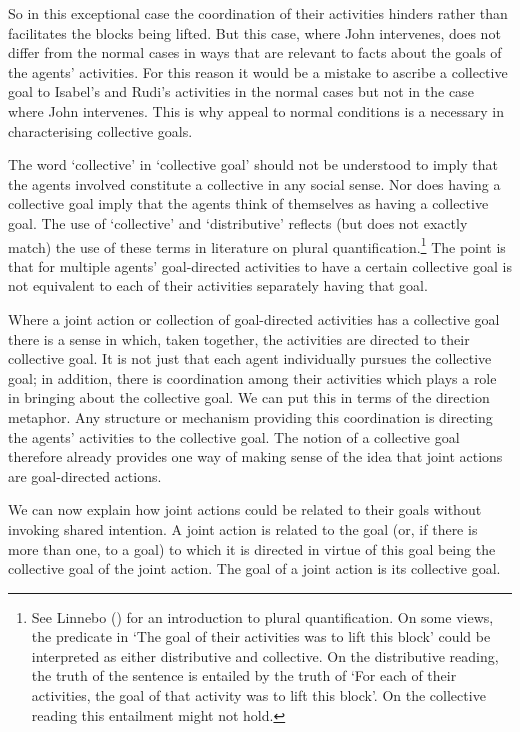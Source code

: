 \documentclass[12pt,a4paper]{extarticle}
\begin{document}
So in this exceptional case the coordination of their activities hinders rather than facilitates the blocks being lifted.
But this case, where John intervenes, does not differ from the normal cases in ways that are relevant to facts about the goals of the agents' activities.  
For this reason it would be a mistake to ascribe a collective goal to Isabel's and Rudi's activities in the normal cases but not in the case where John intervenes. 
This is why appeal to normal conditions is a necessary in characterising collective goals.



The word `collective' in `collective goal' should not be understood to imply that the agents  involved constitute a collective in any social sense.  Nor does having a collective goal imply that the agents think of themselves as having a collective goal.  The use of `collective' and `distributive' reflects  (but does not exactly match) the use of these terms in literature on plural quantification.\footnote{
See Linnebo (\citeyear{Linnebo:2005ig}) for an introduction to plural quantification.  On some views, the predicate in `The goal of their activities was to lift this block' could be interpreted as either distributive and collective.  On the distributive reading, the truth of the sentence is entailed by the truth of `For each of their activities, the goal of that activity was to lift this block'.  On the collective reading this entailment might not hold.
}
The point is that for multiple agents' goal-directed activities to have a certain collective goal is not equivalent to each of their activities separately having that goal.


Where a joint action or collection of goal-directed activities has a collective goal there is a sense in which, taken together, the activities are directed to their collective goal.  It is not just that each agent individually pursues the collective goal; in addition, there is coordination among their activities which plays a role in bringing about the collective goal.  We can put this in terms of the direction metaphor.  Any structure or mechanism providing this coordination is directing the agents' activities to the collective goal.  The notion of a collective goal therefore already provides one way of making sense of the idea that joint actions are goal-directed actions.

We can now explain how joint actions could be related to their goals without invoking shared intention.  A joint action is related to the goal (or, if there is more than one, to a goal) to which it is directed in virtue of this goal  being the collective goal of the joint action.  The goal of a joint action is its collective goal.
\end{document}

